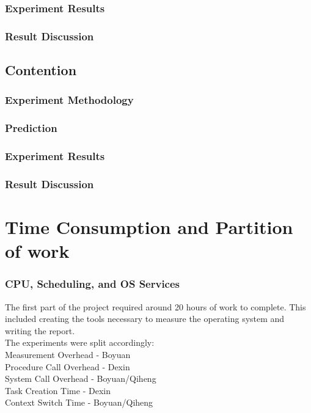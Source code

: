 \documentclass{article} %
\begin{document}
\subsubsection{Experiment Results}
\subsubsection{Result Discussion}

\subsection{Contention}

\subsubsection{Experiment Methodology}
\subsubsection{Prediction}
\subsubsection{Experiment Results}
\subsubsection{Result Discussion}

\section{Time Consumption and Partition of work}
\subsubsection{CPU, Scheduling, and OS Services}
The first part of the project required around 20 hours of work to complete. This included creating the tools necessary to measure the operating system and writing the report.\\
The experiments were split accordingly:\\
Measurement Overhead - Boyuan\\
Procedure Call Overhead - Dexin\\
System Call Overhead - Boyuan/Qiheng\\
Task Creation Time - Dexin\\
Context Switch Time - Boyuan/Qiheng\\
\end{document}
